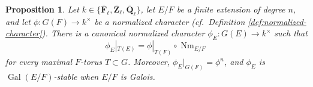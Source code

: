 \documentclass[reqno]{amsart}
\numberwithin{equation}{subsection}
\newcommand{\F}{\mathbf{F}}
\newcommand{\Q}{\mathbf{Q}}
\newcommand{\Z}{\mathbf{Z}}
\newcommand{\Gal}{\operatorname{Gal}}
\newcommand{\ol}[1]{\overline{#1}}
\newcommand{\co}{\colon}
\DeclareMathOperator{\Nm}{Nm}
\DeclareMathOperator{\Fr}{Fr}
\newtheorem{lemma}[thm]{Lemma}
\newtheorem{prop}[thm]{Proposition}
\theoremstyle{remark}
\numberwithin{equation}{subsection}
\numberwithin{figure}{subsection}
\begin{document}



\begin{prop}\label{prop:extend-normalized-characters}
Let $k \in \{\ol\F_\ell, \ol\Z_\ell, \ol\Q_\ell\}$, let $E/F$ be a finite extension of degree $n$, and let $\phi\co G(F)\to k^\times$ be a normalized character (cf.\ Definition \ref{def:normalized-character}). There is a canonical normalized character $\phi_E\co G(E)\to k^\times$ such that
\[
\phi_E|_{T(E)}=\phi|_{T(F)}\circ \Nm_{E/F}
\]
for every maximal $F$-torus $T\subset G$. Moreover, $\phi_E|_{G(F)}=\phi^n$, and $\phi_E$ is $\Gal(E/F)$-stable when $E/F$ is Galois.
\end{prop}
\end{document}
